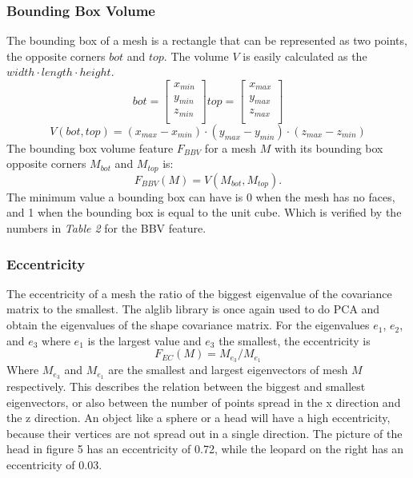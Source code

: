 \documentclass{bigdata}
\begin{document}
\subsubsection{Bounding Box Volume}
The bounding box of a mesh is a rectangle that can be represented as two points, the opposite corners $bot$ and $top$. The volume $V$ is easily calculated as the $width \cdot length \cdot height$.
\[
bot =
\begin{bmatrix}
x_{min} \\
y_{min} \\
z_{min} \\
\end{bmatrix}
top =
\begin{bmatrix}
x_{max} \\
y_{max} \\
z_{max} \\
\end{bmatrix}
\]
\begin{equation}
V(bot,top) = (x_{max} - x_{min}) \cdot (y_{max}-y_{min}) \cdot (z_{max}-z_{min})
\end{equation}
The bounding box volume feature $F_{BBV}$ for a mesh $M$ with its bounding box opposite corners $M_{bot}$ and $M_{top}$ is:
\begin{equation}
F_{BBV}(M) = V(M_{bot},M_{top}).
\end{equation}
The minimum value a bounding box can have is 0 when the mesh has no faces, and 1 when the bounding box is equal to the unit cube. Which is verified by the numbers in \textit{Table 2} for the BBV feature. 

\subsubsection{Eccentricity}
The eccentricity of a mesh the ratio of the biggest eigenvalue of the covariance matrix to the smallest. The alglib library is once again used to do PCA and obtain the eigenvalues of the shape covariance matrix. For the eigenvalues $e_1$, $e_2$, and $e_3$ where $e_1$ is the largest value and $e_3$ the smallest, the eccentricity is
\begin{equation}
F_{EC}(M) = M_{e_3} / M_{e_1}
\end{equation}
Where $M_{e_3}$ and $M_{e_1}$ are the smallest and largest eigenvectors of mesh $M$ respectively. This describes the relation between the biggest and smallest eigenvectors, or also between the number of points spread in the x direction and the z direction. An object like a sphere or a head will have a high eccentricity, because their vertices are not spread out in a single direction. The picture of the head in figure 5 has an eccentricity of 0.72, while the leopard on the right has an eccentricity of 0.03.
\end{document}

